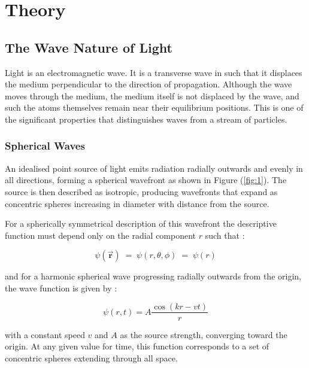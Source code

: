 \documentclass[12pt]{article}
\begin{document}
\section{Theory} \label{sec:2}

\subsection{The Wave Nature of Light} \label{sec:2.1}

Light is an electromagnetic wave. It is a transverse wave in such that it displaces the medium perpendicular to the direction of propagation.
Although the wave moves through the medium, the medium itself is not displaced by the wave, and such the atoms themselves remain near their equilibrium positions.
This is one of the significant properties that distinguishes waves from a stream of particles.
\cite{hecht2012optics}

\subsubsection{Spherical Waves} \label{sec:2.1.1}

An idealised point source of light emits radiation radially outwards and evenly in all directions, forming a spherical wavefront as shown in Figure (\ref{fig:1}).
The source is then described as isotropic, producing wavefronts that expand as concentric spheres increasing in diameter with distance from the source.
\cite{hecht2012optics}

For a spherically symmetrical description of this wavefront the descriptive function must depend only on the radial component \( r \) such that \cite{hecht2012optics,Born_Wolf_Bhatia_Clemmow_Gabor_Stokes_Taylor_Wayman_Wilcock_1999}:

\begin{equation} \label{eq:1}
    \psi(\vec{\mathbf{r}}) \; = \; \psi(r,\theta,\phi) \; =\; \psi(r)
\end{equation}

and for a harmonic spherical wave progressing radially outwards from the origin, the wave function is given by \cite{hecht2012optics}:

\begin{equation}\label{eq:2}
    \psi(r,t) = A \frac{\cos(kr - v t)}{r}
\end{equation}

with a constant speed \( v \) and \( A \) as the source strength, converging toward the origin. At any given value for time, this function corresponds to a set of concentric spheres extending through all space. \cite{hecht2012optics}
\end{document}
